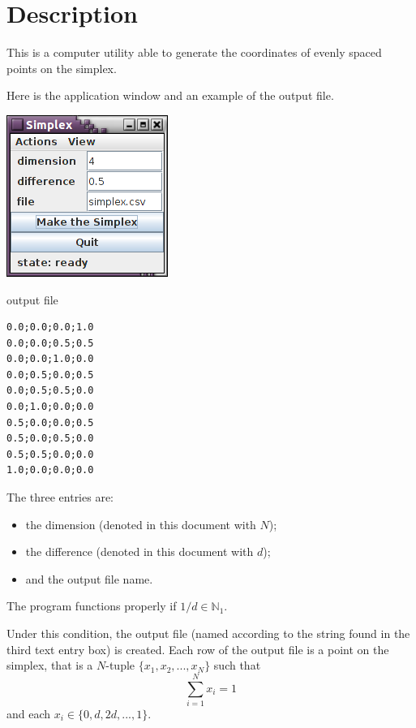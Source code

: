 \documentclass[12pt,a4paper]{article}
\begin{document}
 

\section*{Description}
This is a computer utility able to generate the coordinates of evenly spaced points on the simplex.


Here is the application window and an example of the output file.

\vspace{1cm}

\begin{minipage}{0.5\textwidth}
\includegraphics[scale=1]{fig1.png}
\end{minipage}
\hspace{1cm}
\begin{minipage}{0.4\textwidth}
output file 

\begin{verbatim}
0.0;0.0;0.0;1.0
0.0;0.0;0.5;0.5
0.0;0.0;1.0;0.0
0.0;0.5;0.0;0.5
0.0;0.5;0.5;0.0
0.0;1.0;0.0;0.0
0.5;0.0;0.0;0.5
0.5;0.0;0.5;0.0
0.5;0.5;0.0;0.0
1.0;0.0;0.0;0.0
\end{verbatim}
\end{minipage}

\vspace{1cm}

The three entries are: 
\begin{itemize}
\item the dimension (denoted in this document with $N$);
\item the difference (denoted in this document with $d$);
\item and the output file name.
\end{itemize}

The program functions properly if $1/d \in \mathbb{N}_1$.


Under this condition, the output file (named according to the string found in the third text entry box) is created. Each row of the output file is a point on the simplex, that is a $N$-tuple $\{x_1,x_2,...,x_N\}$ such that
\[
\sum_{i=1}^N x_i=1
\]
and each $x_i \in \{0,d,2d,...,1\}$.
\end{document}
